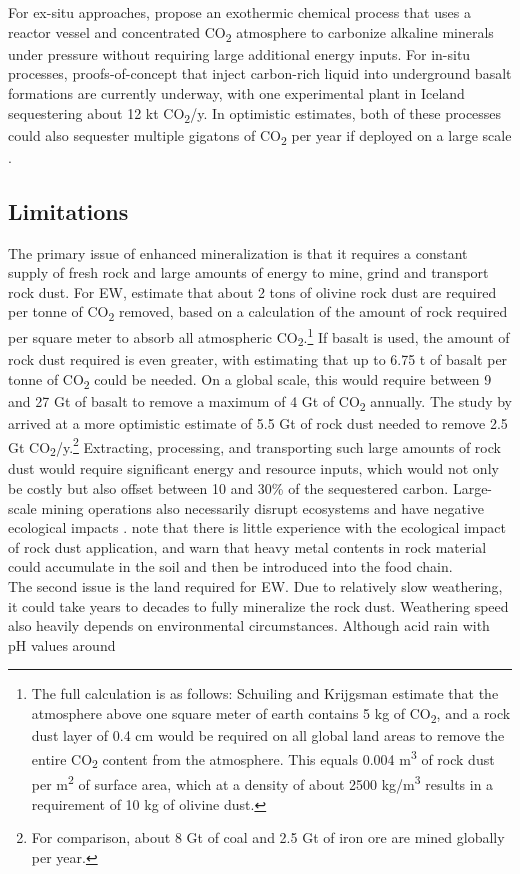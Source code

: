For ex-situ approaches, \textcite{Lackner1997ProgressSubstrates} propose an exothermic chemical process that uses a reactor vessel and concentrated CO\textsubscript{2} atmosphere to carbonize alkaline minerals under pressure without requiring large additional energy inputs. For in-situ processes, proofs-of-concept that inject carbon-rich liquid into underground basalt formations are currently underway, with one experimental plant in Iceland sequestering about 12 kt CO\textsubscript{2}/y. In optimistic estimates, both of these processes could also sequester multiple gigatons of CO\textsubscript{2} per year if deployed on a large scale \parencite{Dipple2021TheSystems}.
\subsection*{Limitations}
The primary issue of enhanced mineralization is that it requires a constant supply of fresh rock and large amounts of energy to mine, grind and transport rock dust. For EW, \textcite{Schuiling2006EnhancedCo2} estimate that about 2 tons of olivine rock dust are required per tonne of CO\textsubscript{2} removed, based on a calculation of the amount of rock required per square meter to absorb all atmospheric CO\textsubscript{2}.\footnote{The full calculation is as follows: Schuiling and Krijgsman estimate that the atmosphere above one square meter of earth contains 5 kg of CO\textsubscript{2}, and a rock dust layer of 0.4 cm would be required on all global land areas to remove the entire CO\textsubscript{2} content from the atmosphere. This equals 0.004 m\textsuperscript{3} of rock dust per m\textsuperscript{2} of surface area, which at a density of about 2500 kg/m\textsuperscript{3} results in a requirement of 10 kg of olivine dust.} If basalt is used, the amount of rock dust required is even greater, with \textcite{Beerling2018FarmingSecurity} estimating that up to 6.75 t of basalt per tonne of CO\textsubscript{2} could be needed. On a global scale, this would require between 9 and 27 Gt of basalt to remove a maximum of 4 Gt of CO\textsubscript{2} annually. The study by \textcite{Goll2021PotentialRock} arrived at a more optimistic estimate of 5.5 Gt of rock dust needed to remove 2.5 Gt CO\textsubscript{2}/y.\footnote{For comparison, about 8 Gt of coal and 2.5 Gt of iron ore are mined globally per year.} Extracting, processing, and transporting such large amounts of rock dust would require significant energy and resource inputs, which would not only be costly but also offset between 10 and 30\% of the sequestered carbon. Large-scale mining operations also necessarily disrupt ecosystems and have negative ecological impacts \parencite{Beerling2018FarmingSecurity}. \textcite{Almaraz2022MethodsSettings} note that there is little experience with the ecological impact of rock dust application, and warn that heavy metal contents in rock material could accumulate in the soil and then be introduced into the food chain.\\The second issue is the land required for EW. Due to relatively slow weathering, it could take years to decades to fully mineralize the rock dust. Weathering speed also heavily depends on environmental circumstances. Although acid rain with pH values around 